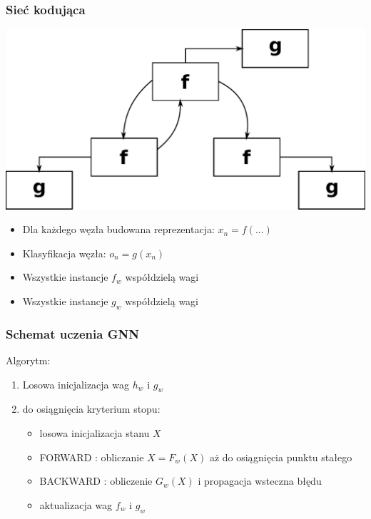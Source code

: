 \documentclass{beamer}
\begin{document}
\begin{frame}
\frametitle{Sieć kodująca}
\begin{center}
	\includegraphics[scale=0.5]{img/encoding}
\end{center}
\begin{itemize}
	\item Dla każdego węzła budowana reprezentacja: $x_n = f(...)$
	\item Klasyfikacja węzła: $o_n = g(x_n)$
	\item Wszystkie instancje $f_w$ współdzielą wagi
	\item Wszystkie instancje $g_w$ współdzielą wagi
\end{itemize}
\end{frame}

\begin{frame}
\frametitle{Schemat uczenia GNN}
Algorytm:
\begin{enumerate}
	\item Losowa inicjalizacja wag $h_w$ i $g_w$
	\item do osiągnięcia kryterium stopu:
	\begin{itemize}
		\item losowa inicjalizacja stanu $X$
		\item FORWARD : obliczanie $X = F_w(X)$ aż do osiągnięcia punktu stałego
		\item BACKWARD : obliczenie $G_w(X)$ i propagacja wsteczna błędu
		\item aktualizacja wag $f_w$ i $g_w$
	\end{itemize}
\end{enumerate}
\end{frame}
\end{document}
